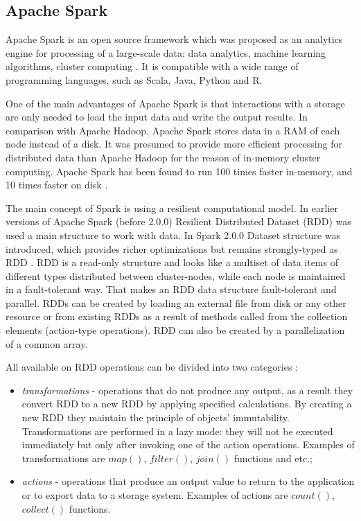 \subsection{Apache Spark}

Apache Spark is an open source framework which was proposed as an analytics engine for processing of a large-scale data: data analytics, machine learning algorithms, cluster computing \cite{online:apache_spark}. It is compatible with a wide range of programming languages, such as Scala, Java, Python and R.

One of the main advantages of Apache Spark is that interactions with a storage are only needed to load the input data and write the output results. In comparison with Apache Hadoop, Apache Spark stores data in a RAM of each node instead of a disk. It was presumed to provide more efficient processing for distributed data than Apache Hadoop for the reason of in-memory cluster computing. Apache Spark has been found to run 100 times faster in-memory, and 10 times faster on disk \cite{online:had_vs_sp}.

The main concept of Spark is using a resilient computational model. In earlier versions of Apache Spark (before 2.0.0) Resilient Distributed Dataset (RDD) was used a main structure to work with data. In Spark 2.0.0 Dataset structure was introduced, which provides richer optimizations but remains strongly-typed as RDD \cite{online:apache_spark}. RDD is a read-only structure and looks like a multiset of data items of different types distributed between cluster-nodes, while each node is maintained in a fault-tolerant way. That makes an RDD data structure fault-tolerant and parallel. RDDs can be created by loading an external file from disk or any other resource or from existing RDDs as a result of methods called from the collection elements (action-type operations). RDD can also be created by a parallelization of a common array. 

All available on RDD operations can be divided into two categories \cite{inproceedings:rdd-off}:
\begin{itemize}
	\item \textit{transformations} - operations that do not produce any output, as a result they convert RDD to a new RDD by applying specified calculations. By creating a new RDD they maintain the principle of objects' immutability. Transformations are performed in a lazy mode: they will not be executed immediately but only after invoking one of the action operations. Examples of transformations are $map()$, $filter()$, $join()$ functions and etc.;
	\item \textit{actions} - operations that produce an output value to return to the application or to export data to a storage system. Examples of actions are $count()$, $collect()$ functions.
\end{itemize}

